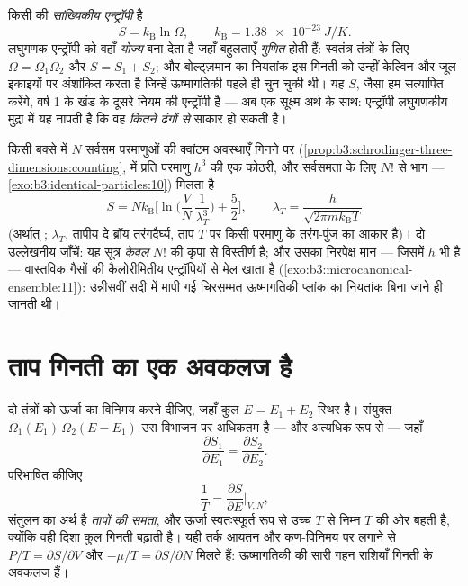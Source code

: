 \begin{definition}[बोल्ट्ज़मान एन्ट्रॉपी]\label{def:b3:microcanonical-ensemble:entropy}
किसी  की \emph{सांख्यिकीय एन्ट्रॉपी} है
\[
S = k_{\text{B}}\ln\Omega , \qquad
k_{\text{B}} = \qty{1.38e-23}{J/K} .
\]
लघुगणक एन्ट्रॉपी को वहाँ \emph{योज्य} बना देता है जहाँ बहुलताएँ
\emph{गुणित} होती हैं: स्वतंत्र तंत्रों के लिए $\Omega = \Omega_1\Omega_2$
और $S = S_1 + S_2$; और बोल्ट्ज़मान का नियतांक इस गिनती को उन्हीं
केल्विन-और-जूल इकाइयों पर अंशांकित करता है जिन्हें ऊष्मागतिकी पहले ही
चुन चुकी थी। यह
$S$, जैसा हम सत्यापित करेंगे, वर्ष 1 के खंड के दूसरे नियम की
एन्ट्रॉपी है --- अब एक सूक्ष्म अर्थ के साथ: एन्ट्रॉपी लघुगणकीय
मुद्रा में यह नापती है कि वह  \emph{कितने ढंगों से}
साकार हो सकती है।
\end{definition}

\begin{proposition}[आदर्श गैस की एन्ट्रॉपी]\label{prop:b3:microcanonical-ensemble:gas}
किसी बक्से में $N$ सर्वसम परमाणुओं की क्वांटम अवस्थाएँ गिनने पर
(\cref{prop:b3:schrodinger-three-dimensions:counting},  में
प्रति परमाणु $h^3$ की एक कोठरी, और सर्वसमता के लिए $N!$ से भाग ---
\cref{exo:b3:identical-particles:10}) मिलता है
\[
S = Nk_{\text{B}}\Big[\ln\Big(\frac VN\,\frac1{\lambda_T^3}\Big)
 + \frac52\Big] , \qquad
\lambda_T = \frac{h}{\sqrt{2\pi mk_{\text{B}}T}}
\]
(अर्थात् \emph{}; $\lambda_T$, तापीय दे
ब्रॉय तरंगदैर्घ्य, ताप $T$ पर किसी परमाणु के तरंग-पुंज का आकार है)।
दो उल्लेखनीय जाँचें: यह सूत्र \emph{केवल} $N!$ की कृपा से विस्तीर्ण
है; और उसका निरपेक्ष मान --- जिसमें $h$ भी है --- वास्तविक गैसों की
कैलोरीमितीय एन्ट्रॉपियों से मेल खाता है
(\cref{exo:b3:microcanonical-ensemble:11}): उन्नीसवीं सदी में मापी
गई चिरसम्मत ऊष्मागतिकी प्लांक का नियतांक बिना जाने ही जानती थी।
\end{proposition}
\admitted

\section{ताप गिनती का एक अवकलज है}

\begin{theorem}[संतुलन और ताप]\label{thm:b3:microcanonical-ensemble:temperature}
दो तंत्रों को ऊर्जा का विनिमय करने दीजिए, जहाँ कुल $E = E_1 + E_2$
स्थिर है। संयुक्त  $\Omega_1(E_1)\,\Omega_2(E - E_1)$
उस विभाजन पर अधिकतम है --- और अत्यधिक रूप से --- जहाँ
\[
\frac{\partial S_1}{\partial E_1} =
\frac{\partial S_2}{\partial E_2} .
\]
परिभाषित कीजिए
\[
\frac1T = \frac{\partial S}{\partial E}\bigg|_{V,N} ,
\]
संतुलन का अर्थ है \emph{तापों की समता}, और ऊर्जा स्वतःस्फूर्त रूप से
उच्च $T$ से निम्न $T$ की ओर बहती है, क्योंकि वही दिशा कुल गिनती
बढ़ाती है। यही तर्क आयतन और कण-विनिमय पर लगाने से
$P/T = \partial S/\partial V$ और $-\mu/T
= \partial S/\partial N$ मिलते हैं: ऊष्मागतिकी की सारी गहन
राशियाँ गिनती के अवकलज हैं।
\end{theorem}

